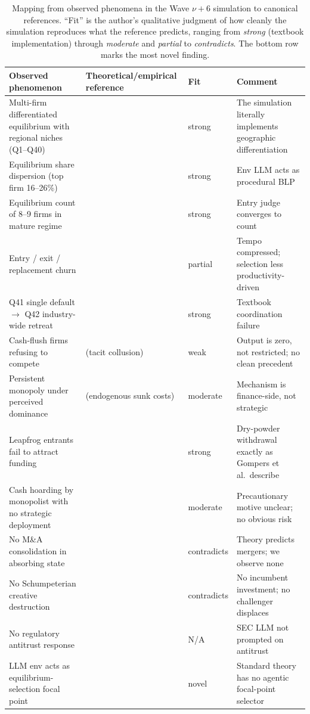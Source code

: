 \documentclass[11pt]{article}
\begin{document}
\begin{table}[h]
\centering
\small
\begin{tabular}{p{4.2cm}p{5.5cm}p{1.4cm}p{3.0cm}}
\toprule
\textbf{Observed phenomenon} & \textbf{Theoretical/empirical reference} & \textbf{Fit} & \textbf{Comment} \\
\midrule
Multi-firm differentiated equilibrium with regional niches (Q1--Q40) & \citet{Hotelling1929,Salop1979,dAspremontGabszewiczThisse1979} & strong & The simulation literally implements geographic differentiation \\
Equilibrium share dispersion (top firm 16--26\%) & \citet{BerryLevinsohnPakes1995,Nevo2001} & strong & Env LLM acts as procedural BLP \\
Equilibrium count of 8--9 firms in mature regime & \citet{BresnahanReiss1991,Sutton1991} & strong & Entry judge converges to count \\
Entry / exit / replacement churn & \citet{Klepper1996,Hopenhayn1992,Jovanovic1982} & partial & Tempo compressed; selection less productivity-driven \\
Q41 single default $\to$ Q42 industry-wide retreat & \citet{CooperJohn1988,DiamondDybvig1983} & strong & Textbook coordination failure \\
Cash-flush firms refusing to compete & \citet{Tirole1988,FudenbergMaskin1986} (tacit collusion) & weak & Output is zero, not restricted; no clean precedent \\
Persistent monopoly under perceived dominance & \citet{Sutton1991} (endogenous sunk costs) & moderate & Mechanism is finance-side, not strategic \\
Leapfrog entrants fail to attract funding & \citet{Gompers1995,GompersLerner2001,KortumLerner2000} & strong & Dry-powder withdrawal exactly as Gompers et al.\ describe \\
Cash hoarding by monopolist with no strategic deployment & \citet{BatesKahleStulz2009} & moderate & Precautionary motive unclear; no obvious risk \\
No M\&A consolidation in absorbing state & \citet{SalantSwitzerReynolds1983,FarrellShapiro1990} & contradicts & Theory predicts mergers; we observe none \\
No Schumpeterian creative destruction & \citet{Schumpeter1942,AghionHowitt1992} & contradicts & No incumbent investment; no challenger displaces \\
No regulatory antitrust response & \citet{Whinston2007,KhanAmazon2017} & N/A & SEC LLM not prompted on antitrust \\
LLM env acts as equilibrium-selection focal point & \citet{Schelling1960,MailathPostlewaite1990} & novel & Standard theory has no agentic focal-point selector \\
\bottomrule
\end{tabular}
\caption{Mapping from observed phenomena in the Wave $\nu+6$ simulation to canonical references. ``Fit'' is the author's qualitative judgment of how cleanly the simulation reproduces what the reference predicts, ranging from \emph{strong} (textbook implementation) through \emph{moderate} and \emph{partial} to \emph{contradicts}. The bottom row marks the most novel finding.}
\label{tab:synthesis}
\end{table}
\end{document}
